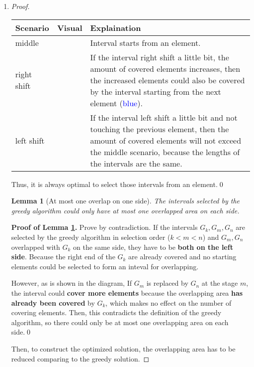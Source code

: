 \documentclass[12pt,a4paper]{article}
\makeatletter
\newtheorem{lemma}[theorem]{Lemma}
\newtheorem*{solution}{Solution}
\theoremstyle{definition}
\renewenvironment{solution}[1][Solution] {\par\pushQED{\qed}\normalfont\topsep6\p@\@plus6\p@\relax\trivlist\item[\hskip\labelsep\bfseries#1\@addpunct{.}]\ignorespaces}{\popQED\endtrivlist\@endpefalse} \makeatother
\makeatother
\begin{document}
\begin{enumerate}
\begin{solution}
\begin{enumerate}
\begin{proof}
		   \begin{tabular}{m{2cm}|m{7.5cm}|m{5cm}}
			\bfseries Scenario &\bfseries Visual & \bfseries Explaination \\
			\hline
			middle &  & Interval starts from an element.\\
			\hline
			right shift &  & If the interval right shift a little bit, the amount of covered elements increases, then the increased elements could also be covered by the interval starting from the next element (\textcolor{blue}{blue}).\\
			\hline
			left shift &  & If the interval left shift a little bit and not touching the previous element, then the amount of covered elements will not exceed the middle scenario, because the lengths of the intervals are the same.
		   \end{tabular}
		   
		   Thus, it is always optimal to select those intervals from an element.\hfil \qed \vspace{\parskip}

		   \begin{lemma}[At most one overlap on one side]\label{lem:ov}
			   The intervals selected by the greedy algorithm could only have at most one overlapped area on each side.
		   \end{lemma}
		   \textbf{Proof of Lemma \ref{lem:ov}.} Prove by contradiction. If the intervals $G_k,G_m,G_n$ are selected by the greedy algorithm in selection order ($k<m<n$) and $G_m, G_n$ overlapped with $G_k$ on the same side, they have to be \textbf{both on the left side}. Because the right end of the $G_k$ are already covered and no starting elements could be selected to form an inteval for overlapping.

		   \begin{figure}[H]
			\centering
			
		   \end{figure}

		   However, as is shown in the diagram, If $G_m$ is replaced by $G_n$ at the stage $m$, the interval could \textbf{cover more elements} because the overlapping area \textbf{has already been covered} by $G_k$, which makes no effect on the number of covering elements. Then, this contradicts the definition of the greedy algorithm, so there could only be at most one overlapping area on each side.\hfil \qed \vspace{\parskip}

		   Then, to construct the optimized solution, the overlapping area has to be reduced comparing to the greedy solution. 


\end{proof}
\end{enumerate}
\end{solution}
\end{enumerate}
\end{document}
